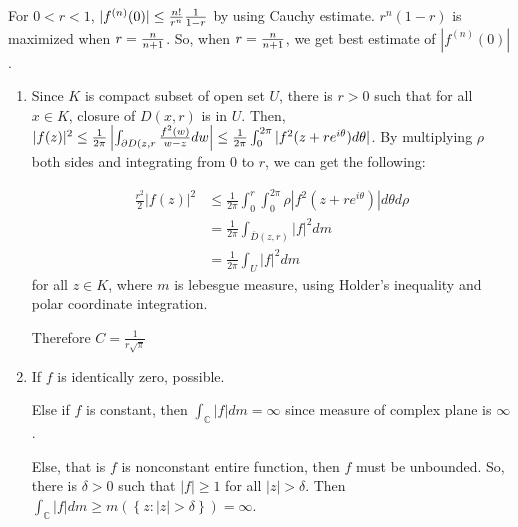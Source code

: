 \begin{problem}[3.2] \hfill

	For $0 < r < 1$, $|f^{(n)}(0) | \leq {n! \over r^n} {1 \over 1-r}$ by using Cauchy estimate.
	$r^n(1-r)$ is maximized when $r = {n \over n+1}$. So, when $r = {n \over n+1}$, we get best estimate of $|f^{\left( n \right)}\left( 0 \right)|$.
	
\end{problem}

\begin{problem}[3.3] \hfill
	\begin{enumerate}[label =(\alph*)]
		\item Since $K$ is compact subset of open set $U$, there is $r >0$ such that for all $x\in K$, closure of  $D(x, r)$ is in $U$.
			Then, $|f(z)|^2 \leq {1 \over 2\pi} \left | \int_{\partial D(z, r} {f^2(w) \over w-z}dw \right | \leq {1 \over 2\pi}  \int_0^{2\pi}|f^2(z+re^{i\theta})d\theta|$.
	By multiplying $\rho$ both sides and integrating from $0$ to $r$, we can get the following:
	
	\begin{equation*}
		\begin{split}
			\frac{r^2}{2}|f(z)|^2 & \leq \frac{1}{2\pi} \int_0^r \int_0^{2\pi}\rho|f^2(z+re^{i\theta})|d\theta d\rho \\
				& = \frac{1}{2\pi} \int_{\overline{D}(z, r)}|f|^2dm \\
				& = \frac{1}{2\pi}\int_U |f|^2 dm
		\end{split}
	\label{<+label+>}
	\end{equation*}
	for all $z \in K$, where $m$ is lebesgue measure,  using Holder's inequality and polar coordinate integration.

	Therefore $C = \frac{1}{r\sqrt{\pi}}$
\item If $f$ is identically zero, possible.

	Else if $f$ is constant, then $\int_{\mathbb{C}}|f|dm = \infty$ since measure of complex plane is $\infty$.

	Else, that is $f$ is nonconstant entire function, then $f$ must be unbounded. So, there is $\delta > 0 $ such that $|f| \geq 1$ for all $ |z| > \delta$. Then $\int_{\mathbb{C}}|f| dm \geq m\left( \left\{ z: |z| > \delta \right\} \right) = \infty$.
\end{enumerate}
\end{problem}


